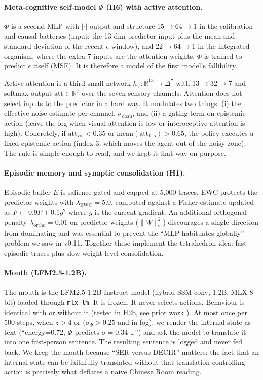 \documentclass[11pt,a4paper]{article}
\begin{document}
\paragraph{Meta-cognitive self-model $\Phi$ (H6) with active attention.} $\Phi$ is a second MLP with $|\cdot|$ output and structure 15$\rightarrow$64$\rightarrow$1 in the calibration and causal batteries (input: the 13-dim predictor input plus the mean and standard deviation of the recent $\epsilon$ window), and 22$\rightarrow$64$\rightarrow$1 in the integrated organism, where the extra 7 inputs are the attention weights. $\Phi$ is trained to predict $\epsilon$ itself (MSE). It is therefore a model of the first model's fallibility.

Active attention is a third small network $h_\psi: \mathbb{R}^{13} \rightarrow \Delta^7$ with 13$\rightarrow$32$\rightarrow$7 and softmax output $\mathrm{att} \in \mathbb{R}^7$ over the seven sensory channels. Attention does not select inputs to the predictor in a hard way. It modulates two things: (i) the effective noise estimate per channel, $\sigma_{\mathrm{chan}}$, and (ii) a gating term on epistemic action (leave the fog when visual attention is low or interoceptive attention is high). Concretely, if $\mathrm{att}_{\mathrm{vis}} < 0.35$ or $\mathrm{mean}(\mathrm{att}_{1:5}) > 0.65$, the policy executes a fixed epistemic action (index 3, which moves the agent out of the noisy zone). The rule is simple enough to read, and we kept it that way on purpose.

\paragraph{Episodic memory and synaptic consolidation (H1).} Episodic buffer $E$ is salience-gated and capped at 5,000 traces. EWC \cite{kirkpatrick2017} protects the predictor weights with $\lambda_{\mathrm{EWC}}=5.0$, computed against a Fisher estimate updated as $F \leftarrow 0.9F + 0.1 g^2$ where $g$ is the current gradient. An additional orthogonal penalty $\lambda_{\mathrm{ortho}}=0.01$ on predictor weights ($\|W\|_2^2$) discourages a single direction from dominating and was essential to prevent the ``MLP habituates globally'' problem we saw in v0.11. Together these implement the tetrahedron idea: fast episodic traces plus slow weight-level consolidation.

\paragraph{Mouth (LFM2.5-1.2B).} The mouth is the LFM2.5-1.2B-Instruct model (hybrid SSM-conv, 1.2B, MLX 8-bit) loaded through \texttt{mlx\_lm}. It is frozen. It never selects actions. Behaviour is identical with or without it (tested in H2b, see prior work \cite{lfm2025}). At most once per 500 steps, when $z>4$ or ($\sigma_\Phi>0.25$ and in fog), we render the internal state as text (``energy=0.72, $\Phi$ predicts $\sigma=0.34$ \dots'') and ask the model to translate it into one first-person sentence. The resulting sentence is logged and never fed back. We keep the mouth because ``SER versus DECIR'' matters: the fact that an internal state can be faithfully translated without that translation controlling action is precisely what deflates a naive Chinese Room reading.
\end{document}
